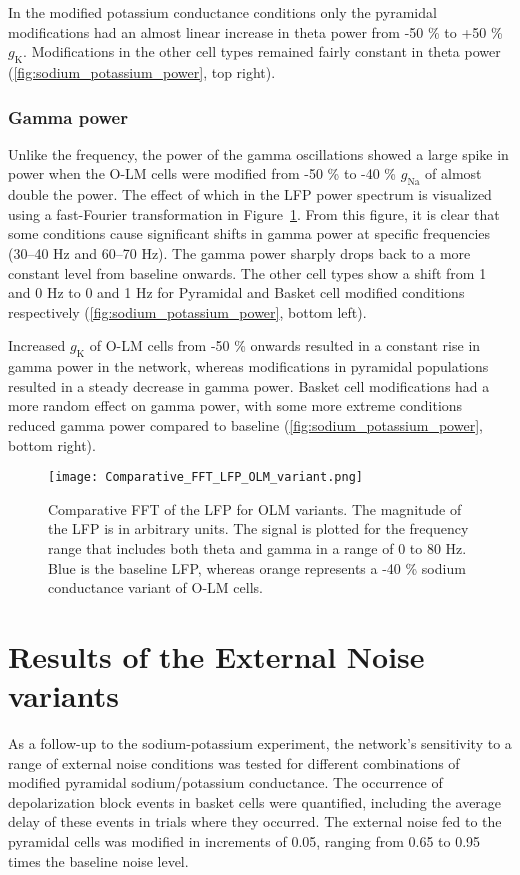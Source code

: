 In the modified potassium conductance conditions only the pyramidal modifications had an almost linear increase in theta power from -50 \% to +50 \% \(g_{\text{K}}\).
Modifications in the other cell types remained fairly constant in theta power (\ref{fig:sodium_potassium_power}, top right).

\subsubsection{Gamma power}
Unlike the frequency, the power of the gamma oscillations showed a large spike in power when the O-LM cells were modified from -50 \% to -40 \% \(g_{\text{Na}}\) of almost double the power.
The effect of which in the LFP power spectrum is visualized using a fast-Fourier transformation in Figure~\ref{fig:comparative_fft_olm_variant}.
From this figure, it is clear that some conditions cause significant shifts in gamma power at specific frequencies (30--40 Hz and 60--70 Hz).
The gamma power sharply drops back to a more constant level from baseline onwards.
The other cell types show a shift from 1 and 0 Hz to 0 and 1 Hz for Pyramidal and Basket cell modified conditions respectively (\ref{fig:sodium_potassium_power}, bottom left).

Increased \(g_{\text{K}}\) of O-LM cells from -50 \% onwards resulted in a constant rise in gamma power in the network, whereas modifications in pyramidal populations resulted in a steady decrease in gamma power.
Basket cell modifications had a more random effect on gamma power, with some more extreme conditions reduced gamma power compared to baseline (\ref{fig:sodium_potassium_power}, bottom right).

\begin{figure}[htbp]
    \centering
    \texttt{[image: Comparative\_FFT\_LFP\_OLM\_variant.png]}
    \caption[Comparative FFT of LFP\@: O-LM variants]{Comparative FFT of the LFP for OLM variants.
        The magnitude of the LFP is in arbitrary units.
        The signal is plotted for the frequency range that includes both theta and gamma in a range of 0 to 80 Hz.
        Blue is the baseline LFP, whereas orange represents a -40 \% sodium conductance variant of O-LM cells.}\label{fig:comparative_fft_olm_variant}
\end{figure}

\pagebreak

\section{Results of the External Noise variants}
As a follow-up to the sodium-potassium experiment, the network's sensitivity to a range of external noise conditions was tested for different combinations of modified pyramidal sodium/potassium conductance.
The occurrence of depolarization block events in basket cells were quantified, including the average delay of these events in trials where they occurred.
The external noise fed to the pyramidal cells was modified in increments of 0.05, ranging from 0.65 to 0.95 times the baseline noise level.\\

